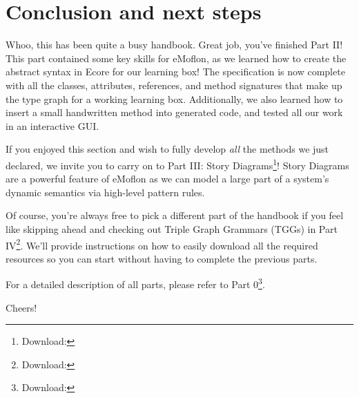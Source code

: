 \newpage
\section{Conclusion and next steps}
\genHeader

\vspace{0.5cm}

Whoo, this has been quite a busy handbook. Great job, you've finished Part II! This part contained some key skills for eMoflon, as we learned how to create
the abstract syntax in Ecore for our learning box! The specification is now complete with all the classes, attributes, references, and
method signatures that make up the type graph for a working learning box. Additionally, we also learned how to insert a small handwritten method into generated
code, and tested all our work in an interactive GUI.

If you enjoyed this section and wish to fully develop \emph{all} the methods we just declared, we invite you to carry on to Part III: Story
Diagrams\footnote{Download: \dlPartThree}! Story Diagrams are a powerful feature of eMoflon as we can model a large part of a system's dynamic semantics via high-level pattern rules. 


Of course, you're always free to pick a different part of the handbook if you feel like skipping ahead and checking out Triple Graph Grammars (TGGs) in Part IV\footnote{Download: \dlPartFour}. 
We'll provide instructions on how to easily download all the required resources so you can start without having to complete the previous parts.

For a detailed description of all parts, please refer to Part 0\footnote{Download: \dlPartZero}.

\vspace{1.0cm}

Cheers!
